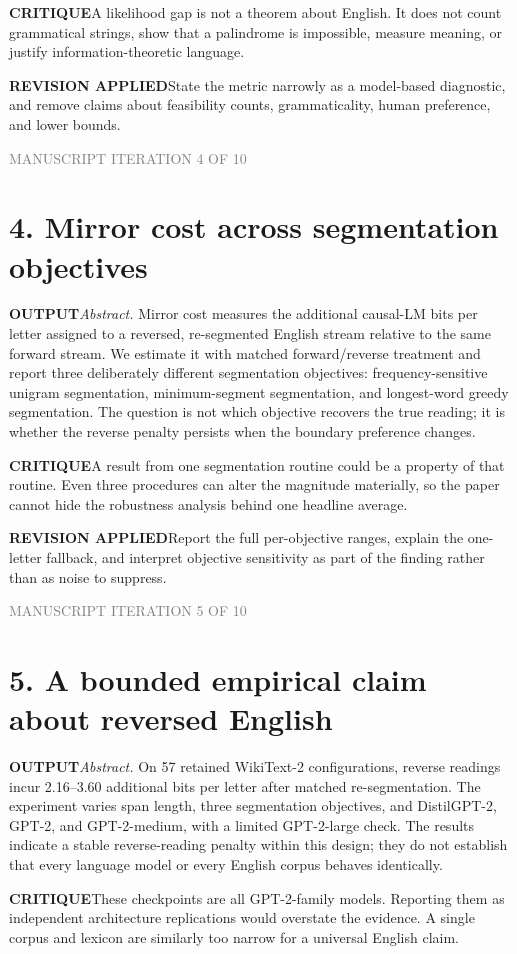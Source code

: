 \documentclass[10pt]{article}
\newcommand{\outputlabel}{\textcolor{teal!65!black}{\textbf{OUTPUT}}}
\newcommand{\critiquelabel}{\textcolor{red!65!black}{\textbf{CRITIQUE}}}
\newcommand{\reviselabel}{\textcolor{blue!65!black}{\textbf{REVISION APPLIED}}}
\newcommand{\pass}[1]{\textcolor{gray}{\small MANUSCRIPT ITERATION #1 OF 10}}
\begin{document}
\critiquelabel\quad A likelihood gap is not a theorem about English. It does not count grammatical strings, show that a palindrome is impossible, measure meaning, or justify information-theoretic language.

\reviselabel\quad State the metric narrowly as a model-based diagnostic, and remove claims about feasibility counts, grammaticality, human preference, and lower bounds.

\newpage
\pass{4}
\section*{4. Mirror cost across segmentation objectives}
\outputlabel\quad \emph{Abstract.} Mirror cost measures the additional causal-LM bits per letter assigned to a reversed, re-segmented English stream relative to the same forward stream. We estimate it with matched forward/reverse treatment and report three deliberately different segmentation objectives: frequency-sensitive unigram segmentation, minimum-segment segmentation, and longest-word greedy segmentation. The question is not which objective recovers the true reading; it is whether the reverse penalty persists when the boundary preference changes.

\critiquelabel\quad A result from one segmentation routine could be a property of that routine. Even three procedures can alter the magnitude materially, so the paper cannot hide the robustness analysis behind one headline average.

\reviselabel\quad Report the full per-objective ranges, explain the one-letter fallback, and interpret objective sensitivity as part of the finding rather than as noise to suppress.

\newpage
\pass{5}
\section*{5. A bounded empirical claim about reversed English}
\outputlabel\quad \emph{Abstract.} On 57 retained WikiText-2 configurations, reverse readings incur 2.16--3.60 additional bits per letter after matched re-segmentation. The experiment varies span length, three segmentation objectives, and DistilGPT-2, GPT-2, and GPT-2-medium, with a limited GPT-2-large check. The results indicate a stable reverse-reading penalty within this design; they do not establish that every language model or every English corpus behaves identically.

\critiquelabel\quad These checkpoints are all GPT-2-family models. Reporting them as independent architecture replications would overstate the evidence. A single corpus and lexicon are similarly too narrow for a universal English claim.
\end{document}
